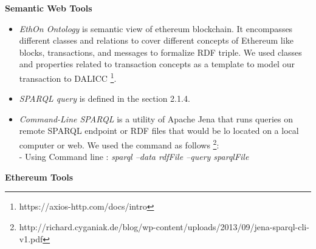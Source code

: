 \textbf{Semantic Web Tools}\\
\begin{itemize}
	\item \textit{EthOn Ontology} is semantic view of ethereum blockchain. It encompasses different classes and relations to cover different concepts of Ethereum like blocks, transactions, and messages to formalize RDF triple. We used classes and properties related to transaction concepts as a template to model our transaction to DALICC \footnote{https://axios-http.com/docs/intro}.
	\item \textit{SPARQL query} is defined in the section 2.1.4.
	\item \textit{Command-Line SPARQL} is a utility of Apache Jena that runs queries on remote SPARQL endpoint or RDF files that would be lo located on a local computer or web. We used the command as follows \footnote{http://richard.cyganiak.de/blog/wp-content/uploads/2013/09/jena-sparql-cli-v1.pdf}:\\
	 - Using Command line : \textit{sparql --data rdfFile --query sparqlFile} 
\end{itemize}
\textbf{Ethereum Tools}


